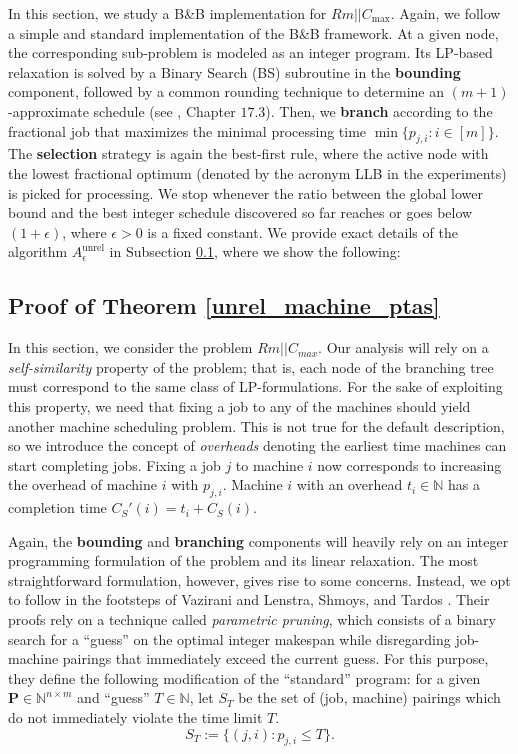 \documentclass[a4paper,UKenglish,cleveref, autoref, thm-restate, pdfa]{lipics-v2021}
\newcommand{\N}{\mathbb{N}}
\theoremstyle{plain}
\begin{document}
In this section, we study a B\&B implementation for $Rm || C_{\max}$.
Again, we follow a simple and standard implementation of the B\&B framework. At a given node, the corresponding sub-problem is modeled as an integer program. Its LP-based relaxation is solved by a Binary Search (BS) subroutine in the \textbf{bounding} component, followed by a common rounding technique to determine an $(m+1)$-approximate schedule (see \cite{vazirani}, Chapter $17.3$). Then, we \textbf{branch} according to the fractional job that maximizes the minimal processing time $\min \{p_{j, i}: i \in [m]\}$. The \textbf{selection} strategy is again the best-first rule, where the active node with the lowest fractional optimum (denoted by the acronym LLB in the experiments) is picked for processing. We stop whenever the ratio between the global lower bound and the best integer schedule discovered so far reaches or goes below $(1+\epsilon)$, where $\epsilon>0$ is a fixed constant. We provide exact details of the algorithm $A^{\text{unrel}}_{\epsilon}$ in Subsection \ref{sec:js_ptas_proof}, where we show the following:

\unrel
 
\subsection{Proof of Theorem \ref{unrel_machine_ptas}}\label{sec:js_ptas_proof}

In this section, we consider the problem $Rm||C_{max}$. Our analysis will rely on a \emph{self-similarity} property of the problem; that is, each node of the branching tree must correspond to the same class of LP-formulations. For the sake of exploiting this property, we need that fixing a job to any of the machines should yield another machine scheduling problem. This is not true for the default description, so we introduce the concept of \emph{overheads} denoting the earliest time machines can start completing jobs. Fixing a job $j$ to machine $i$ now corresponds to increasing the overhead of machine $i$ with $p_{j, i}$. Machine $i$ with an overhead $t_i \in \N$ has a completion time $C_S'(i)= t_i + C_S(i)$.

Again, the \textbf{bounding} and \textbf{branching} components will heavily rely on an integer programming formulation of the problem and its linear relaxation. The most straightforward formulation, however, gives rise to some concerns. Instead, we opt to follow in the footsteps of Vazirani \cite{vazirani} and Lenstra, Shmoys, and Tardos \cite{lenstra_shmoys_tardos}. Their proofs rely on a technique called \emph{parametric pruning}, which consists of a binary search for a ``guess'' on the optimal integer makespan while disregarding job-machine pairings that immediately exceed the current guess. For this purpose, they define the following modification of the ``standard'' program: for a given $\bm{P} \in \mathbb{N}^{n\times m}$ and ``guess'' $T \in \mathbb{N}$, let $S_T$ be the set of (job, machine) pairings which do not immediately violate the time limit $T$.
\[
S_T := \{(j,i): p_{j,i} \le T\}.
\]
\end{document}
